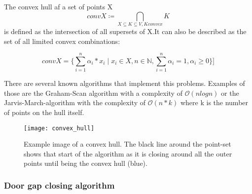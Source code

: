 The convex hull af a set of points X \begin{equation}conv X \coloneqq \underset{X \subseteq K \subseteq V, K convex}{\bigcap} K  \end{equation} is defined as the intersection of all supersets of X.It can also be described as the set of all limited convex combinations:

\begin{equation}conv X = \{ \sum_{i=1}^{n}\alpha_{i} * x_{i} \mid x_{i} \in X, n \in \mathbb{N}, \sum_{i=1}^{n} \alpha_i = 1, \alpha_i \geq 0  \}]\end{equation}

There are several known algorithms that implement this problems. Examples of those are the Graham-Scan algorithm with a complexity of  $\mathcal{O}(n log n)$ or the Jarvis-March-algorithm with the complexity of $\mathcal{O}(n*k)$ where k is the number of points on the hull itself.

\begin{figure}[h]
	\centering
	\texttt{[image: convex\_hull]}
	\caption{Example image of a convex hull. The black line around the point-set shows that start of the algorithm as it is closing around all the outer points until  being the convex hull (blue).}
	\label{fig:convex_hull}
\end{figure}


\pagebreak

\subsubsection{Door gap closing algorithm}

